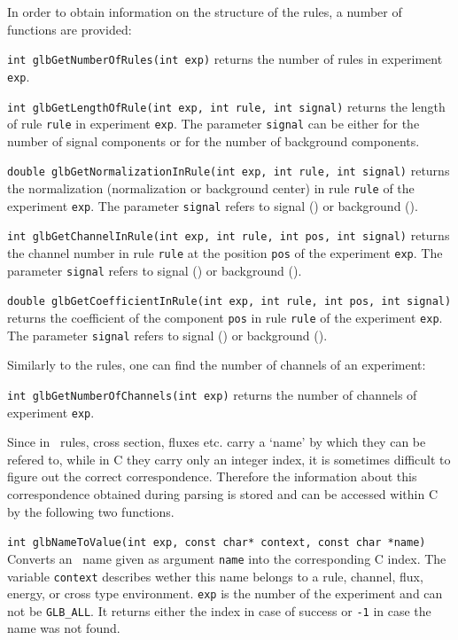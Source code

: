 In order to obtain information on the structure of the rules, 
a number of functions are provided:
\begin{function}
{\tt int glbGetNumberOfRules(int exp)} returns the number of
rules in experiment {\tt exp}.
\end{function}
\begin{function}
{\tt int glbGetLengthOfRule(int exp, int rule, int signal)} returns
the length of rule {\tt rule} in experiment {\tt exp}. The parameter
{\tt signal} can be either  for the number of signal
components or  for the number of background components.
\end{function}
\begin{function}
{\tt double glbGetNormalizationInRule(int exp, int rule, int signal)}
returns the normalization (normalization or background center)
in rule {\tt rule} of the experiment {\tt exp}.
The parameter {\tt signal} refers to signal () or background
().
\end{function}
\begin{function}
{\tt int glbGetChannelInRule(int exp, int rule, int pos, int signal)}
returns the channel number in rule {\tt rule} at the position {\tt pos}
of the experiment {\tt exp}.
The parameter {\tt signal} refers to signal () or background
().
\end{function}
\begin{function}
{\tt double glbGetCoefficientInRule(int exp, int rule, int pos, int signal)}
returns the coefficient of the component {\tt pos} in rule {\tt rule} 
of the experiment {\tt exp}.
The parameter {\tt signal} refers to signal () or background
().
\end{function}
%
Similarly to the rules, one can find the number of channels of an experiment:
\begin{function}
{\tt int glbGetNumberOfChannels(int exp)} returns the number of 
channels of experiment {\tt exp}.
\end{function} 


Since in \AEDL\, rules, cross section, fluxes etc. carry a `name' by
which they can be refered to, while in C they carry only an integer
index, it is sometimes difficult to figure out the correct correspondence.
Therefore the information about this correspondence obtained during
parsing is stored and can be accessed within C by the following two functions.
\begin{function}
{\tt int glbNameToValue(int exp, const char* context, const char *name)}
Converts an \AEDL\ name given as argument {\tt name} into the corresponding
C index. The variable {\tt context} describes wether this name belongs
to a rule, channel, flux, energy, or cross type environment. {\tt exp}
is the number of the experiment and can not be {\tt GLB\_ALL}. It returns
either the index in case of success or {\tt -1} in case the name was not
found. 
\end{function}

